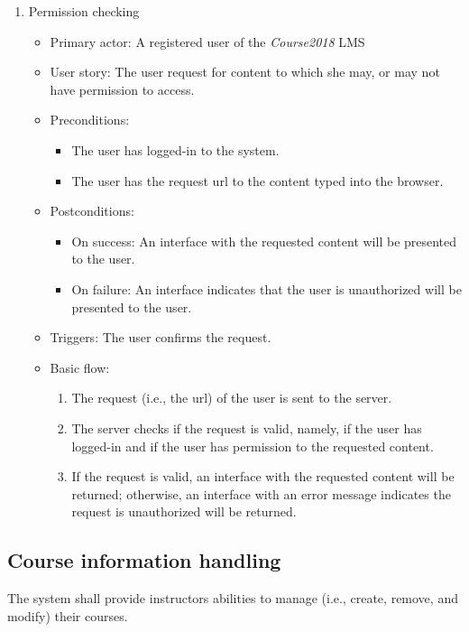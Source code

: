 \begin{enumerate}
\item Permission checking
\begin{itemize}
\item Primary actor: 
    A registered user of the \emph{Course2018} LMS
\item User story:
    The user request for content to which she may, or may not have permission
    to access.
\item Preconditions:
    \begin{itemize}
        \item The user has logged-in to the system.
        \item The user has the request url to the content typed into the
            browser.
    \end{itemize}
\item Postconditions:
    \begin{itemize}
        \item On success: An interface with the requested content will be presented
            to the user.
        \item On failure: An interface indicates that the user is unauthorized will
            be presented to the user.
    \end{itemize}
\item Triggers: The user confirms the request.
\item Basic flow:
    \begin{enumerate}
        \item The request (i.e., the url) of the user is sent to the server.
        \item The server checks if the request is valid, namely, if the user
            has logged-in and if the user has permission to the requested
            content.
        \item If the request is valid, an interface with the requested content will
            be returned; otherwise, an interface with an error message indicates
            the request is unauthorized will be returned.
    \end{enumerate}
\end{itemize}

\end{enumerate}


\subsection{Course information handling}
The system shall provide instructors abilities to manage (i.e., create, remove,
and modify) their courses.
